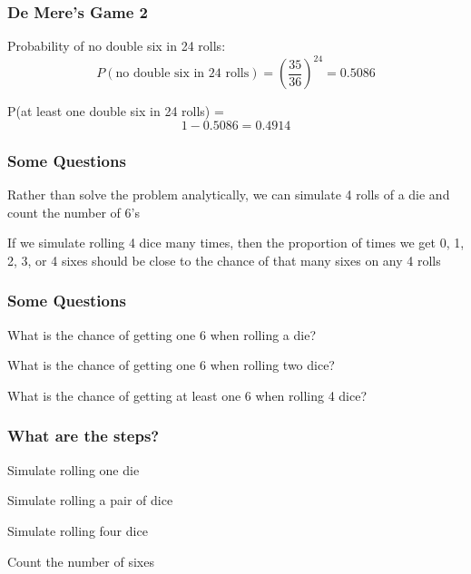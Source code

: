 \documentclass[12pt]{beamer}\usepackage[]{graphicx}\usepackage[]{color}
\begin{document}

\begin{frame}[fragile]
\frametitle{De Mere's Game 2}

Probability of no double six in 24 rolls:
$$
P(\text{no double six in 24 rolls}) = \left(\frac{35}{36}\right)^{24} = 0.5086
$$

\bigskip
\pause
P(at least one double six in 24 rolls) = 
$$
1 - 0.5086 = 0.4914
$$

\end{frame}


\begin{frame}
\begin{center}
\Huge{}
\end{center}
\end{frame}


\begin{frame}
\frametitle{Some Questions}

\bbi
  \item Rather than solve the problem analytically, we can simulate 4 rolls of a die and count the number of 6's
  \item If we simulate rolling 4 dice many times, then the proportion of times we get 0, 1, 2, 3, or 4 sixes should be close to the chance of that many sixes on any 4 rolls
\ei

\end{frame}


\begin{frame}
\frametitle{Some Questions}

\bbi
  \item What is the chance of getting one 6 when rolling a die?
  \item What is the chance of getting one 6 when rolling two dice?
  \item What is the chance of getting at least one 6 when rolling 4 dice?
\ei

\end{frame}


\begin{frame}
\frametitle{What are the steps?}

\bbi
  \item Simulate rolling one die
  \item Simulate rolling a pair of dice
  \item Simulate rolling four dice
  \item Count the number of sixes
\ei

\end{frame}
\end{document}
